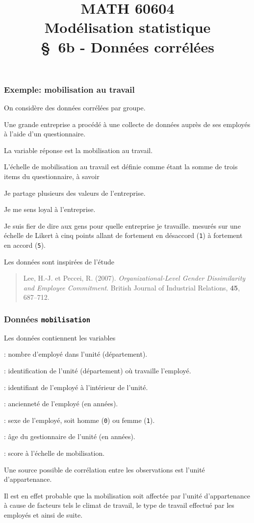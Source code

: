 \documentclass{beamer}
\title[\color{white}{MATH 60604 \S~6b - Données corrélées}]{\texorpdfstring{MATH 60604 \\Modélisation statistique \\ \S~6b - Données corrélées}{MATH 60604 \\Modélisation statistique \\ \S~6b - Données corrélées}}
\author{}
\institute{HEC Montréal\\
Département de sciences de la décision}
\date{}
\begin{document}
\frame{\titlepage}

%

\begin{frame}[fragile]
\frametitle{Exemple: mobilisation au travail}
 On considère des données corrélées par groupe.

\bi
\item  Une grande entreprise a procédé à une collecte de données auprès de ses
employés à l'aide d'un questionnaire.
\item La variable réponse est la \alert{mobilisation au travail}.
\item L'échelle de mobilisation au travail est
définie comme étant la somme de trois items du questionnaire, à savoir
\bi
\vp
\item Je partage plusieurs des valeurs de l'entreprise.
\item Je me sens loyal à l'entreprise.
\item Je suis fier de dire aux gens pour quelle entreprise je travaille.
\ei
mesurés sur une échelle de
Likert à cinq points allant de fortement en désaccord (\texttt{1}) à fortement en accord (\texttt{5}).
\item Les données sont inspirées de l'étude
\begin{quote}
Lee, H.-J. et Peccei, R. (2007). \textsl{Organizational-Level Gender Dissimilarity and
Employee Commitment}. British Journal of Industrial Relations, \textbf{45}, 687--712.
\end{quote}
\ei
\end{frame}

\begin{frame}[fragile]
\frametitle{Données \texttt{mobilisation}}
\bi
\item  Les données  contiennent les variables
\bi
\vp
\item {}: nombre d'employé dans l'unité (département).
\item {}: identification de l'unité (département) où travaille l'employé.
\item  {}: identifiant de l'employé à l'intérieur de l'unité.
\item {}: ancienneté de l'employé (en années).
\item {}: sexe de l'employé, soit homme (\texttt{0}) ou femme (\texttt{1}).
\item  {}: âge du gestionnaire de l'unité (en années).
\item {}: score à l'échelle de mobilisation.
\ei
\item Une \alert{source possible de corrélation} entre les observations est \alert{l'unité d'appartenance}.
\item Il est en effet probable que la mobilisation soit affectée par l'unité d'appartenance à cause de facteurs tels le climat de travail, le type de travail effectué par les employés et ainsi de suite.
\ei
\end{frame}
\end{document}
